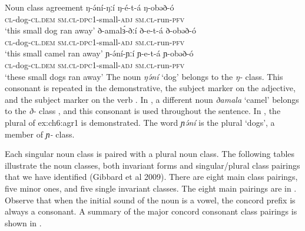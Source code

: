 \ea	Noun class agreement
\ea 
\gll ŋ-ə́ní-ŋːí                 ŋ-é-t-á 	ŋ-obəð-ó	\\
\textsc{cl-}dog-\textsc{cl.dem}    \textsc{sm.cl-}\textsc{dpc1-}small-\textsc{adj}    \textsc{sm.cl-}run-\textsc{pfv}\\
\glt ‘this small dog ran away’ \label{ex:ch6:agr1}
\ex
\gll ð-amalɜ́-ðːí               ð-e-t-á                        ð-obəð-ó \\
\textsc{cl-}dog-\textsc{cl.dem}    \textsc{sm.cl-}\textsc{dpc1-}small-\textsc{adj}    \textsc{sm.cl-}run-\textsc{pfv}\\
\glt ‘this small camel ran away’ \label{ex:ch6:agr2}
\ex
\gll ɲ-ə́ní-ɲːí                 ɲ-e-t-á                          ɲ-obəð-ó \\
\textsc{cl-}dog-\textsc{cl.dem}    \textsc{sm.cl-}\textsc{dpc1-}small-\textsc{adj}    \textsc{sm.cl-}run-\textsc{pfv}\\
\glt ‘these small dogs ran away’ \label{ex:ch6:agr3}
\z
\z 
The noun \textit{ŋə́ní} ‘dog’ belongs to the \textit{ŋ-} class. This consonant is repeated in the demonstrative, the subject marker on the adjective, and the subject marker on the verb . In , a different noun \textit{ðamala} ‘camel’ belongs to the \textit{ð-} class , and this consonant is used throughout the sentence. In , the plural of {ex:ch6:agr1} is demonstrated. The word \textit{ɲə́ní} is the plural ‘dogs’, a member of \textit{ɲ-} class.

Each singular noun class is paired with a plural noun class. The following tables illustrate the noun classes, both invariant forms and singular/plural class pairings that we have identified (Gibbard et al 2009). There are eight main class pairings, five minor ones, and five single invariant classes. The eight main pairings are in . Observe that when the initial sound of the noun is a vowel, the concord prefix is always a consonant. A summary of the major concord consonant class pairings is shown in .

